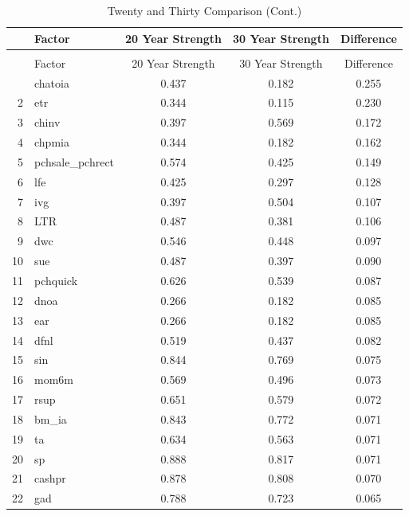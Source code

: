\documentclass[12pt]{article}
\begin{document}
\newpage

\begin{footnotesize}
	\setlength{\tabcolsep}{2pt}
	\singlespacing
	\centering					
	\begin{longtable}{rl|c|c|c}
		\caption{Twenty and Thirty Comparison}\\
		
		\hline
		\hline
		& Factor & 20 Year Strength & 30 Year Strength & Difference \\ 
		\hline
		\endfirsthead
		
		\caption{Twenty and Thirty Comparison (Cont.)}\\
		\hline
		\hline
		& Factor & 20 Year Strength & 30 Year Strength & Difference \\
		\hline
		\endhead
		
		\hline\hline
		\endfoot
		1 & chatoia & 0.437 & 0.182 & 0.255 \\ 
		2 & etr & 0.344 & 0.115 & 0.230 \\ 
		3 & chinv & 0.397 & 0.569 & 0.172 \\ 
		4 & chpmia & 0.344 & 0.182 & 0.162 \\ 
		5 & pchsale\_pchrect & 0.574 & 0.425 & 0.149 \\ 
		6 & lfe & 0.425 & 0.297 & 0.128 \\ 
		7 & ivg & 0.397 & 0.504 & 0.107 \\ 
		8 & LTR & 0.487 & 0.381 & 0.106 \\ 
		9 & dwc & 0.546 & 0.448 & 0.097 \\ 
		10 & sue & 0.487 & 0.397 & 0.090 \\ 
		11 & pchquick & 0.626 & 0.539 & 0.087 \\ 
		12 & dnoa & 0.266 & 0.182 & 0.085 \\ 
		13 & ear & 0.266 & 0.182 & 0.085 \\ 
		14 & dfnl & 0.519 & 0.437 & 0.082 \\ 
		15 & sin & 0.844 & 0.769 & 0.075 \\ 
		16 & mom6m & 0.569 & 0.496 & 0.073 \\ 
		17 & rsup & 0.651 & 0.579 & 0.072 \\ 
		18 & bm\_ia & 0.843 & 0.772 & 0.071 \\ 
		19 & ta & 0.634 & 0.563 & 0.071 \\ 
		20 & sp & 0.888 & 0.817 & 0.071 \\ 
		21 & cashpr & 0.878 & 0.808 & 0.070 \\ 
		22 & gad & 0.788 & 0.723 & 0.065 \\ 

\end{longtable}
\end{footnotesize}
\end{document}
